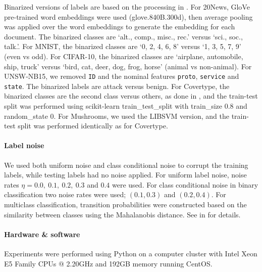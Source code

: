 \documentclass[letterpaper]{article} %
\begin{document}
Binarized versions of labels are based on the processing in \cite{kiryo2017positive,wilton2022positive}.
For 20News, GloVe pre-trained word embeddings \cite{pennington2014glove} were used (glove.840B.300d), 
then average pooling was applied over the word embeddings to generate the embedding for each document. 
The binarized classes are ‘alt., comp., misc., rec.’ versus ‘sci., soc., talk.’.
For MNIST, the binarized classes are  ‘0, 2, 4, 6, 8’ versus ‘1, 3, 5, 7, 9’ (even vs odd).
For CIFAR-10, the binarized classes are ‘airplane, automobile, ship, truck’ versus ‘bird, cat, deer, dog, frog, horse’ (animal vs non-animal).
For UNSW-NB15, we removed \texttt{ID} and the nominal features \texttt{proto}, \texttt{service} and \texttt{state}. 
The binarized labels are attack versus benign.
For Covertype, the binarized classes are the second class versus others, as done in \cite{collobert2001parallel}, and the train-test split was performed using 
scikit-learn train\_test\_split with train\_size 0.8 and random\_state 0.
For Mushrooms, we used the LIBSVM \cite{chang2011libsvm} version, and the train-test split was performed identically as for Covertype. 

\paragraph{Label noise} 
We used both uniform noise and class conditional noise to corrupt the training labels, while testing labels had no noise applied. 
For uniform label noise, noise rates $\eta=0.0,\ 0.1,\ 0.2,\ 0.3$ and $0.4$ were used. 
For class conditional noise in binary classification two noise rates were used; $(0.1,0.3)$ and $(0.2,0.4)$. 
For multiclass classification, transition probabilities were constructed based on the similarity between classes using the Mahalanobis distance. 
See  in  for details. 


\paragraph{Hardware \& software} 
Experiments were performed using Python on a computer cluster with Intel Xeon E5 Family CPUs @ 2.20GHz and 192GB memory running CentOS. 
\end{document}
